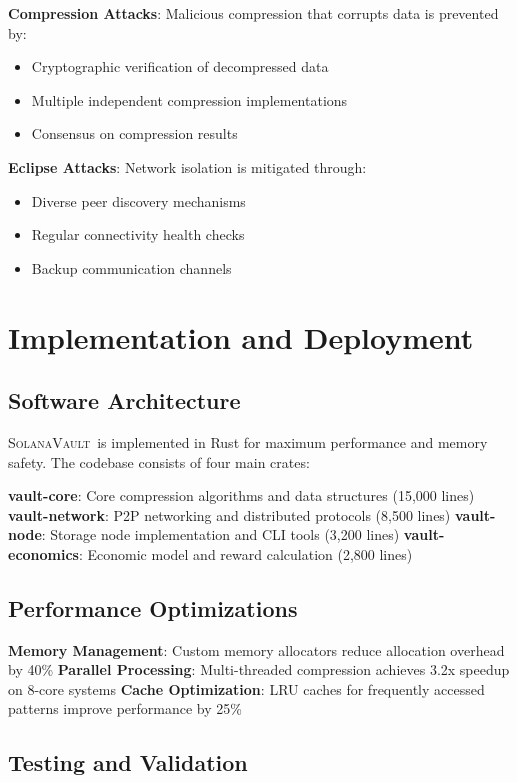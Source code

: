 \documentclass[11pt,a4paper]{article}
\newcommand{\SolanaVault}{\textsc{SolanaVault}}
\begin{document}
\textbf{Compression Attacks}: Malicious compression that corrupts data is prevented by:
\begin{itemize}
\item Cryptographic verification of decompressed data
\item Multiple independent compression implementations
\item Consensus on compression results
\end{itemize}

\textbf{Eclipse Attacks}: Network isolation is mitigated through:
\begin{itemize}
\item Diverse peer discovery mechanisms
\item Regular connectivity health checks
\item Backup communication channels
\end{itemize}

\section{Implementation and Deployment}
\label{sec:implementation}

\subsection{Software Architecture}

\SolanaVault\ is implemented in Rust for maximum performance and memory safety. The codebase consists of four main crates:

\textbf{vault-core}: Core compression algorithms and data structures (15,000 lines)
\textbf{vault-network}: P2P networking and distributed protocols (8,500 lines)
\textbf{vault-node}: Storage node implementation and CLI tools (3,200 lines)
\textbf{vault-economics}: Economic model and reward calculation (2,800 lines)

\subsection{Performance Optimizations}

\textbf{Memory Management}: Custom memory allocators reduce allocation overhead by 40\%
\textbf{Parallel Processing}: Multi-threaded compression achieves 3.2x speedup on 8-core systems
\textbf{Cache Optimization}: LRU caches for frequently accessed patterns improve performance by 25\%

\subsection{Testing and Validation}
\end{document}
